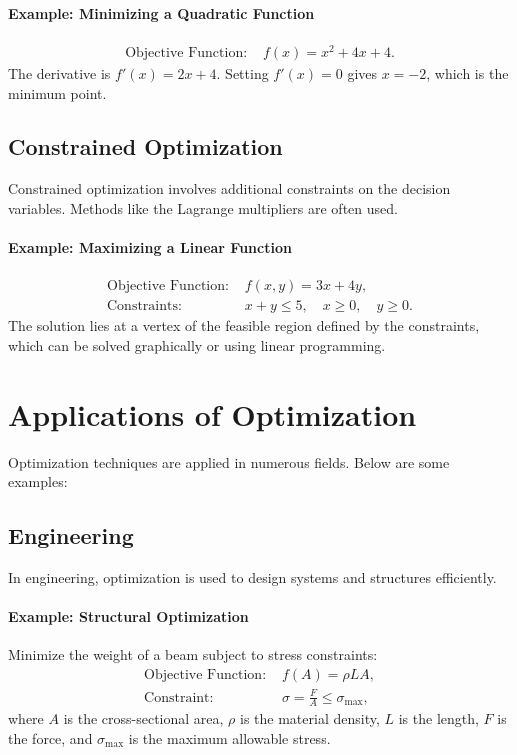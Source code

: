 \documentclass[a4paper,12pt]{article}
\begin{document}
\paragraph{Example: Minimizing a Quadratic Function}
\begin{align*}
\text{Objective Function: } & f(x) = x^2 + 4x + 4.
\end{align*}
The derivative is $f'(x) = 2x + 4$. Setting $f'(x) = 0$ gives $x = -2$, which is the minimum point.

\subsection{Constrained Optimization}
Constrained optimization involves additional constraints on the decision variables. Methods like the Lagrange multipliers are often used.

\paragraph{Example: Maximizing a Linear Function}
\begin{align*}
\text{Objective Function: } & f(x, y) = 3x + 4y, \\
\text{Constraints: } & x + y \leq 5, \quad x \geq 0, \quad y \geq 0.
\end{align*}
The solution lies at a vertex of the feasible region defined by the constraints, which can be solved graphically or using linear programming.

\section{Applications of Optimization}
Optimization techniques are applied in numerous fields. Below are some examples:

\subsection{Engineering}
In engineering, optimization is used to design systems and structures efficiently.
\paragraph{Example: Structural Optimization}
Minimize the weight of a beam subject to stress constraints:
\begin{align*}
\text{Objective Function: } & f(A) = \rho L A, \\
\text{Constraint: } & \sigma = \frac{F}{A} \leq \sigma_{\text{max}},
\end{align*}
where $A$ is the cross-sectional area, $\rho$ is the material density, $L$ is the length, $F$ is the force, and $\sigma_{\text{max}}$ is the maximum allowable stress.
\end{document}
